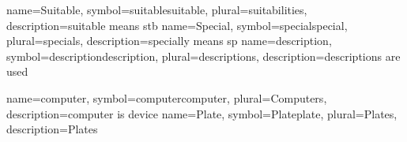 
{
	name={Suitable},
	symbol={suitablesuitable},
	plural={suitabilities},
	description={suitable means stb }
}
{
	name={Special},
	symbol={specialspecial},
	plural={specials},
	description={specially means sp}
}
{
	name={description},
	symbol={descriptiondescription},
	plural={descriptions},
	description={descriptions are used}
}

{
	name={computer},
	symbol={computercomputer},
	plural={Computers},
	description={computer is device}
}
{
	name={Plate},
	symbol={Plateplate},
	plural={Plates},
	description={Plates}
}
